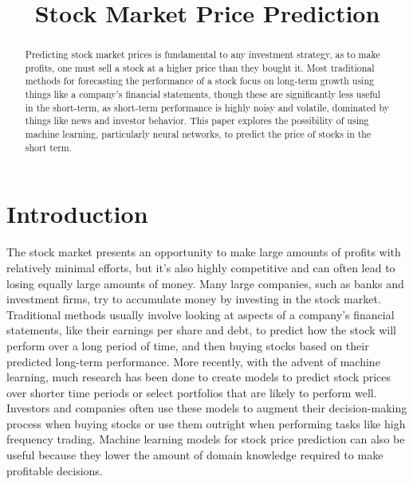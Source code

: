 \documentclass[conference]{IEEEtran}
\begin{document}
\title{Stock Market Price Prediction}

\author{
    }

\maketitle

\begin{abstract}
    Predicting stock market prices is fundamental to any investment strategy, as to make profits, one must sell a stock at a higher price than they bought it. Most traditional methods for forecasting the performance of a stock focus on long-term growth using things like a company's financial statements, though these are significantly less useful in the short-term, as short-term performance is highly noisy and volatile, dominated by things like news and investor behavior. This paper explores the possibility of using machine learning, particularly neural networks, to predict the price of stocks in the short term.
\end{abstract}

\section{Introduction}
The stock market presents an opportunity to make large amounts of profits with relatively minimal efforts, but it's also highly competitive and can often lead to losing equally large amounts of money. Many large companies, such as banks and investment firms, try to accumulate money by investing in the stock market. Traditional methods usually involve looking at aspects of a company's financial statements, like their earnings per share and debt, to predict how the stock will perform over a long period of time, and then buying stocks based on their predicted long-term performance. More recently, with the advent of machine learning, much research has been done to create models to predict stock prices over shorter time periods or select portfolios that are likely to perform well. Investors and companies often use these models to augment their decision-making process when buying stocks or use them outright when performing tasks like high frequency trading. Machine learning models for stock price prediction can also be useful because they lower the amount of domain knowledge required to make profitable decisions.
\end{document}
